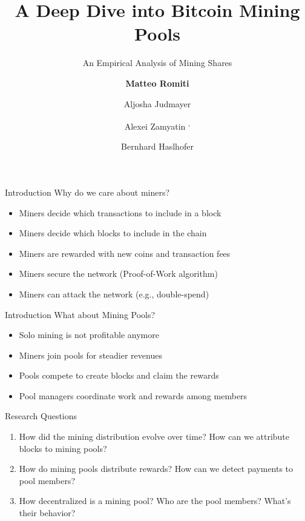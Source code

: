 \documentclass[10pt]{beamer}
\title{A Deep Dive into Bitcoin Mining Pools}
\subtitle{An Empirical Analysis of Mining Shares}
\author[shortname]{\textbf{Matteo Romiti} \inst{1}\and
Aljosha Judmayer \inst{2} \\ \and
Alexei Zamyatin \inst{2}\textsuperscript{,} \inst{3} \and
Bernhard Haslhofer \inst{1}}
\institute[shortinst]{\inst{1} Austrian Institute of Technology \and
\inst{2} SBA Research \and \inst{3} Imperial College London}
\begin{document}
\maketitle

\begin{frame}[fragile]{Introduction}
    Why do we care about miners?
    \begin{itemize}
        \item Miners decide which transactions to include in a block
        \item Miners decide which blocks to include in the chain
        \item Miners are rewarded with new coins and transaction fees
        \item Miners secure the network (Proof-of-Work algorithm)
        \item Miners can attack the network (e.g., double-spend)
    \end{itemize}
\end{frame}

\begin{frame}[fragile]{Introduction}
    What about Mining Pools?
    \begin{itemize}
        \item Solo mining is not profitable anymore
        \item Miners join pools for steadier revenues
        \item Pools compete to create blocks and claim the rewards
        \item Pool managers coordinate work and rewards among members
    \end{itemize}
\end{frame}

\begin{frame}[fragile]{Research Questions} 
    \begin{enumerate}
        \item How did the mining distribution evolve over time? How can we attribute blocks to mining pools? 
        \item How do mining pools distribute rewards? How can we detect payments to pool members?
        \item How decentralized is a mining pool? Who are the pool members? What's their behavior?
    \end{enumerate}
\end{frame}
\end{document}
